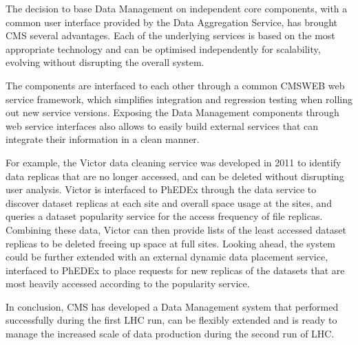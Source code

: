The decision to base Data Management on independent core components, with a common user interface provided by the Data Aggregation Service, has brought CMS several advantages.
Each of the underlying services is based on the most appropriate technology and can be optimised independently for scalability, evolving without disrupting the overall system.

The components are interfaced to each other through a common CMSWEB web service framework, which simplifies integration and regression testing when rolling out new service versions.
Exposing the Data Management components through web service interfaces also allows to easily build external services that can integrate their information in a clean manner.

For example, the Victor \cite{victor} data cleaning service was developed in 2011 to identify data replicas that are no longer accessed, and can be deleted without disrupting user analysis.
Victor is interfaced to PhEDEx through the data service to discover dataset replicas at each site and overall space usage at the sites, and queries a dataset popularity service for the access frequency of file replicas. Combining these data, Victor can then provide lists of the least accessed dataset replicas to be deleted freeing up space at full sites.
Looking ahead, the system could be further extended with an external dynamic data placement service, interfaced to PhEDEx to place requests for new replicas of the datasets that are most heavily accessed according to the popularity service.

In conclusion, CMS has developed a Data Management system that performed successfully during the first LHC run, can be flexibly extended and is ready to manage the increased scale of data production during the second run of LHC.